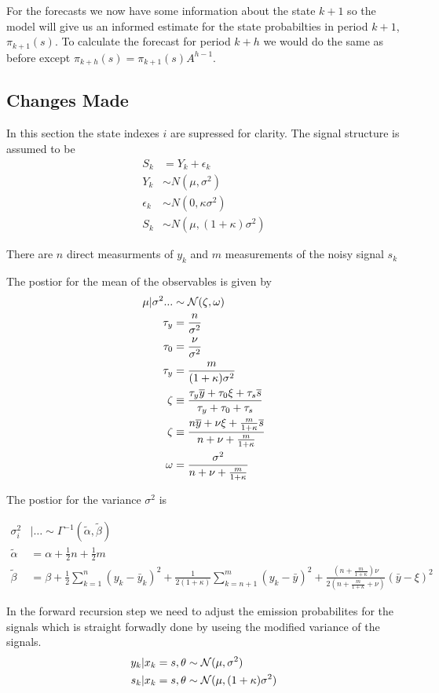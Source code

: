 \documentclass[12pt]{article}
\begin{document}
 For the forecasts we now have some information about the state $k+1$ so the model
 will give us an informed estimate for the state probabilties in period $k+1$,
 $\pi_{k+1}(s)$. To calculate the forecast for period $k+h$ we would do the same as 
 before except $\pi_{k+h}(s) = \pi_{k+1}(s) A^{h-1} $. 


\subsection*{Changes Made}

In this section the state indexes $i$ are supressed for clarity. 
The signal structure is assumed to be 
\begin{align*}
  S_k &= Y_k + \epsilon_k \\
  Y_k &\sim N(\mu, \sigma^2)\\
  \epsilon_k &\sim N(0, \kappa \sigma^2)\\
  S_k &\sim N(\mu, (1+\kappa) \sigma^2)
\end{align*}

There are $n$ direct measurments of $y_k$ and $m$ measurements of the noisy signal
$s_k$

The postior for the mean of the observables is given by
\begin{align*}
  \mu | \sigma^2 ... &\sim \operatorname{\mathcal{N}}(\zeta, \omega ) \\
  \tau_y &= \frac{n}{\sigma^2} \\
  \tau_0 &= \frac{\nu}{\sigma^2} \\
  \tau_y &= \frac{m}{(1 + \kappa) \sigma^2}\\
  \zeta & \equiv \frac{\tau_y \overline{y} + \tau_0 \xi + \tau_s \overline{s}}{\tau_y  + \tau_0  + \tau_s}\\
  \zeta & \equiv \frac{n \overline{y} + \nu \xi + \frac{m}{1+\kappa} \overline{s}}{n + \nu + \frac{m}{1+\kappa}} \\
  \omega &= \frac{\sigma^2}{n + \nu + \frac{m}{1+\kappa}}
\end{align*}

The postior for the variance $\sigma^2$ is 

\begin{align*}
  \sigma_i^2 &| \ldots \sim \Gamma^{-1}(\tilde{\alpha}, \tilde{\beta}) \\
  \tilde{\alpha} &= \alpha +\frac{1}{2}n + \frac{1}{2}m \\
  \tilde{\beta} &= 
  \beta + \frac{1}{2} \sum_{k=1}^n(y_k - \bar{y}_k)^2 + \frac{1}{2(1+\kappa)}\sum_{k=n+1}^m(y_k - \bar{y})^2 + 
  \frac{\left(n + \frac{m}{1+\kappa}\right) \nu}{2(n + \frac{m}{1+\kappa} + \nu)}(\bar{y} - \xi)^2 
\end{align*}

In the forward recursion step we need to adjust the emission probabilites for the signals
which is straight forwadly done by useing the modified variance of the signals.
\begin{align*}
  y_k | x_k = s, \theta &\sim  \operatorname{\mathcal{N}}( \mu , \sigma^2)\\
  s_k | x_k = s, \theta &\sim  \operatorname{\mathcal{N}}( \mu , (1+\kappa)\sigma^2)
\end{align*}
\end{document}
